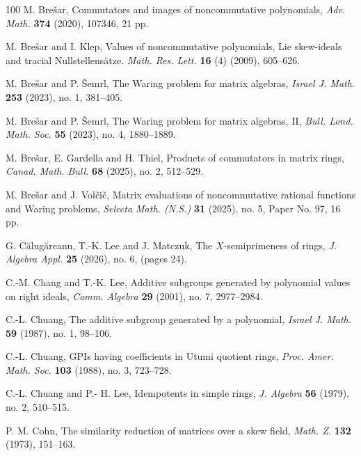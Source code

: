 \documentclass[11pt]{article}
\theoremstyle{definition}
\begin{document}
{{{{\begin{thebibliography}{100}
					 M. Bre\v{s}ar, Commutators and images of noncommutative polynomials, \textit{Adv. Math.} \textbf{374} (2020), 107346, 21 pp.
					
					  M. Bre\v{s}ar and I. Klep,  Values of noncommutative polynomials, Lie skew-ideals and tracial Nullstellensätze.  \textit{Math. Res. Lett.} \textbf{16} (4) (2009), 605--626.
					
					 M. Bre\v{s}ar and P. \v{S}emrl, The Waring problem for matrix algebras, \textit{Israel J. Math.} \textbf{253} (2023), no. 1, 381--405.
					
					 M. Bre\v{s}ar and P. \v{S}emrl, The Waring problem for matrix algebras, II, \textit{Bull. Lond. Math. Soc.} \textbf{55} (2023), no. 4, 1880--1889.
					
					 M. Brešar, E. Gardella and H. Thiel,
					Products of commutators in matrix rings,
					\textit{Canad. Math. Bull.} \textbf{68} (2025), no. 2, 512--529.
					
						 M. Bre\v{s}ar and J.  Vol\v{c}i\v{c}, Matrix evaluations of noncommutative rational functions and Waring problems, \textit{Selecta Math. (N.S.)} \textbf{31} (2025), no. 5, Paper No. 97, 16 pp.				
												
					
					 G. C\u{a}lug\u{a}reanu, T.-K. Lee  and J. Matczuk, The $X$-semiprimeness of rings,
                   \textit{J. Algebra Appl.} {\bf 25} (2026), no. 6, (pages 24).

					 C.-M. Chang and T.-K. Lee, Additive
					subgroups generated by polynomial values on right ideals, \textit{Comm. Algebra}  \textbf{29} (2001), no. 7, 2977--2984.
								
					 C.-L. Chuang,
					The additive subgroup generated by a polynomial,
					\textit{Israel J. Math.} \textbf{59} (1987), no. 1, 98--106.

                   C.-L. Chuang, GPIs having coefficients in Utumi quotient rings, 	\textit{Proc. Amer. Math. Soc.} \textbf{103}  (1988), no. 3, 723--728.

                   C.-L. Chuang and P.- H. Lee, Idempotents in simple rings,
					\textit{J. Algebra} \textbf{56} (1979), no. 2, 510--515.
													
					 P. M. Cohn, The similarity reduction of matrices over a skew field, \textit{Math. Z.} \textbf{132} (1973), 151--163.
					

\end{thebibliography}}}}}
\end{document}
